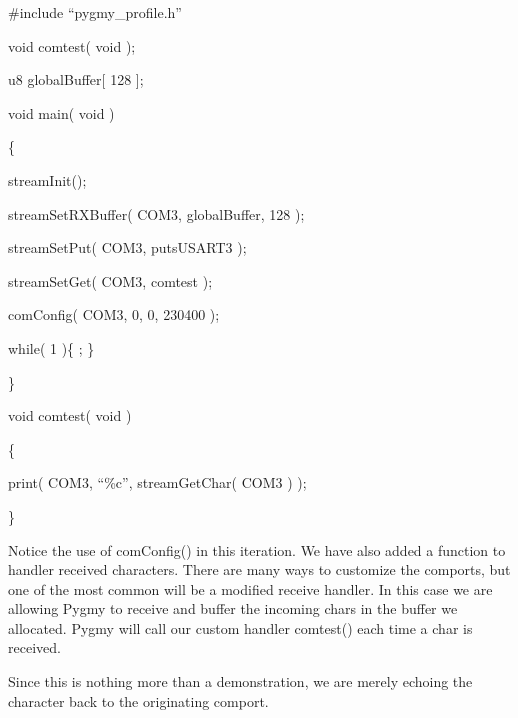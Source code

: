 \documentclass{article}
\begin{document}
\bigskip

\#include {\textquotedblleft}pygmy\_profile.h{\textquotedblright}


\bigskip

void comtest( void );


\bigskip

u8 globalBuffer[ 128 ];


\bigskip

void main( void )

\{

streamInit();

streamSetRXBuffer( COM3, globalBuffer, 128 );

streamSetPut( COM3, putsUSART3 );

streamSetGet( COM3, comtest );

comConfig( COM3, 0, 0, 230400 );


\bigskip

while( 1 )\{ ; \}

\}


\bigskip

void comtest( void )

\{

print( COM3, {\textquotedblleft}\%c{\textquotedblright}, streamGetChar( COM3 ) );

\}


\bigskip

Notice the use of comConfig() in this iteration. We have also added a function to handler received characters. There are many ways to customize the comports, but one of the most common will be a modified receive handler. In this case we are allowing Pygmy to receive and buffer the incoming chars in the buffer we allocated. Pygmy will call our custom handler comtest() each time a char is received.

Since this is nothing more than a demonstration, we are merely echoing the character back to the originating comport.
\end{document}
